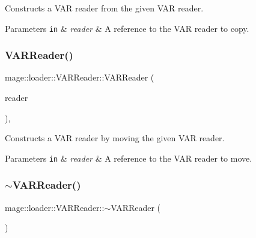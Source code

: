 Constructs a V\+AR reader from the given V\+AR reader.


\begin{DoxyParams}[1]{Parameters}
\mbox{\tt in}  & {\em reader} & A reference to the V\+AR reader to copy. \\
\hline
\end{DoxyParams}
\mbox{\label{classmage_1_1loader_1_1_v_a_r_reader_aeefac440730fc89b16afa19695c956d5}} 
\subsubsection{\texorpdfstring{V\+A\+R\+Reader()}{VARReader()}\hspace{0.1cm}{\footnotesize\ttfamily [3/3]}}
{\footnotesize\ttfamily mage\+::loader\+::\+V\+A\+R\+Reader\+::\+V\+A\+R\+Reader (\begin{DoxyParamCaption}\item[{\mbox{\hyperlink{classmage_1_1loader_1_1_v_a_r_reader}{V\+A\+R\+Reader}} \&\&}]{reader }\end{DoxyParamCaption})\hspace{0.3cm}{\ttfamily [default]}, {\ttfamily [noexcept]}}

Constructs a V\+AR reader by moving the given V\+AR reader.


\begin{DoxyParams}[1]{Parameters}
\mbox{\tt in}  & {\em reader} & A reference to the V\+AR reader to move. \\
\hline
\end{DoxyParams}
\mbox{\label{classmage_1_1loader_1_1_v_a_r_reader_acd3bbd51ccc774d2f74a4520b6143990}} 
\subsubsection{\texorpdfstring{$\sim$\+V\+A\+R\+Reader()}{~VARReader()}}
{\footnotesize\ttfamily mage\+::loader\+::\+V\+A\+R\+Reader\+::$\sim$\+V\+A\+R\+Reader (\begin{DoxyParamCaption}{ }\end{DoxyParamCaption})\hspace{0.3cm}{\ttfamily [default]}}

